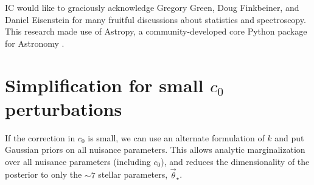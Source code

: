 \documentclass[preprint]{aastex} %
\newcommand{\vt}{\vec{\theta}}
\newcommand{\vstar}{\vt_{\star}}
\begin{document}
\acknowledgments
IC would like to graciously acknowledge Gregory Green, Doug Finkbeiner, and Daniel Eisenstein for many fruitful discussions about statistics and spectroscopy. This research made use of Astropy, a community-developed core Python package for Astronomy \citep{art+13}.

\appendix

\section{Simplification for small $c_0$ perturbations}
\label{sec:gaussian_simplification}
If the correction in $c_0$ is small, we can use an alternate formulation of $k$ and put Gaussian priors on all nuisance parameters. This allows analytic marginalization over all nuisance parameters (including $c_0$), and reduces the dimensionality of the posterior to only the $\sim 7$ stellar parameters, $\vstar$.
\end{document}
